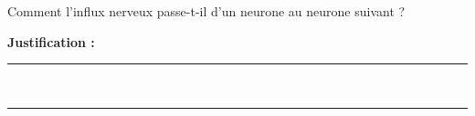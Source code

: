 Comment l'influx nerveux passe-t-il d'un neurone au neurone suivant ?

\choices

\noindent\textbf{Justification :} \hrulefill \\[2.5ex]
\rule{\linewidth}{0.4pt} \\[2.5ex]
\rule{\linewidth}{0.4pt}
\vfill
